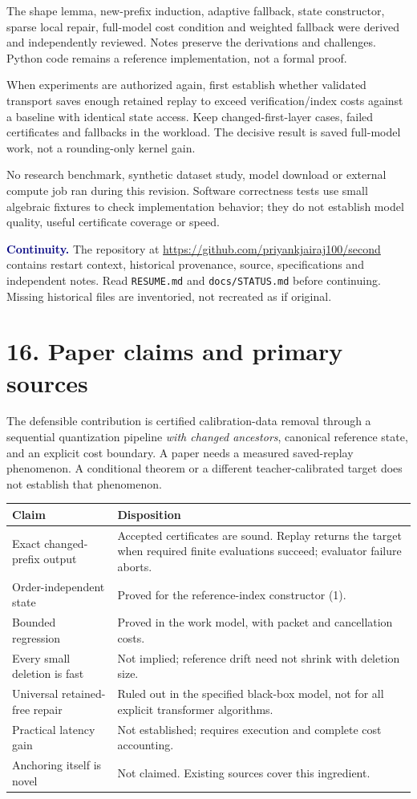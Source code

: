 \documentclass[11pt]{article}
\newcommand{\note}[1]{\textcolor{navy}{\textbf{#1}}}
\begin{document}
The shape lemma, new-prefix induction, adaptive fallback, state constructor, sparse local repair, full-model cost condition and weighted fallback were derived and independently reviewed. Notes preserve the derivations and challenges. Python code remains a reference implementation, not a formal proof.

When experiments are authorized again, first establish whether validated transport saves enough retained replay to exceed verification/index costs against a baseline with identical state access. Keep changed-first-layer cases, failed certificates and fallbacks in the workload. The decisive result is saved full-model work, not a rounding-only kernel gain.

No research benchmark, synthetic dataset study, model download or external compute job ran during this revision. Software correctness tests use small algebraic fixtures to check implementation behavior; they do not establish model quality, useful certificate coverage or speed.

\note{Continuity.} The repository at \url{https://github.com/priyankjairaj100/second} contains restart context, historical provenance, source, specifications and independent notes. Read \texttt{RESUME.md} and \texttt{docs/STATUS.md} before continuing. Missing historical files are inventoried, not recreated as if original.

\newpage
\section*{16. Paper claims and primary sources}
The defensible contribution is certified calibration-data removal through a sequential quantization pipeline \emph{with changed ancestors}, canonical reference state, and an explicit cost boundary. A paper needs a measured saved-replay phenomenon. A conditional theorem or a different teacher-calibrated target does not establish that phenomenon.

\begin{tabularx}{\linewidth}{@{}p{.30\linewidth}X@{}}\toprule
Claim & Disposition\\\midrule
Exact changed-prefix output & Accepted certificates are sound. Replay returns the target when required finite evaluations succeed; evaluator failure aborts.\\
Order-independent state & Proved for the reference-index constructor (1).\\
Bounded regression & Proved in the work model, with packet and cancellation costs.\\
Every small deletion is fast & Not implied; reference drift need not shrink with deletion size.\\
Universal retained-free repair & Ruled out in the specified black-box model, not for all explicit transformer algorithms.\\
Practical latency gain & Not established; requires execution and complete cost accounting.\\
Anchoring itself is novel & Not claimed. Existing sources cover this ingredient.\\\bottomrule
\end{tabularx}
\end{document}
